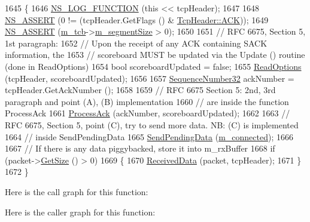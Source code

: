 \begin{DoxyCode}
1645 \{
1646   \hyperlink{log-macros-disabled_8h_a90b90d5bad1f39cb1b64923ea94c0761}{NS\_LOG\_FUNCTION} (\textcolor{keyword}{this} << tcpHeader);
1647 
1648   \hyperlink{assert_8h_a6dccdb0de9b252f60088ce281c49d052}{NS\_ASSERT} (0 != (tcpHeader.GetFlags () & \hyperlink{classns3_1_1TcpHeader_a5f3d432941327854b5ad621e467479c6a1182e63050402c9f49208c62c1ec2d5c}{TcpHeader::ACK}));
1649   \hyperlink{assert_8h_a6dccdb0de9b252f60088ce281c49d052}{NS\_ASSERT} (\hyperlink{classns3_1_1TcpSocketBase_a26bbaf59001308dc43fb630d76f2e38b}{m\_tcb}->\hyperlink{classns3_1_1TcpSocketState_a079872f7b0099ef5f3cab4ff47bd2edd}{m\_segmentSize} > 0);
1650 
1651   \textcolor{comment}{// RFC 6675, Section 5, 1st paragraph:}
1652   \textcolor{comment}{// Upon the receipt of any ACK containing SACK information, the}
1653   \textcolor{comment}{// scoreboard MUST be updated via the Update () routine (done in ReadOptions)}
1654   \textcolor{keywordtype}{bool} scoreboardUpdated = \textcolor{keyword}{false};
1655   \hyperlink{classns3_1_1TcpSocketBase_a5fc67b6d49bb81a520c67cd6018954bb}{ReadOptions} (tcpHeader, scoreboardUpdated);
1656 
1657   \hyperlink{group__network_gacb2070e4e98d2d5135c9bede58f07a03}{SequenceNumber32} ackNumber = tcpHeader.GetAckNumber ();
1658 
1659   \textcolor{comment}{// RFC 6675 Section 5: 2nd, 3rd paragraph and point (A), (B) implementation}
1660   \textcolor{comment}{// are inside the function ProcessAck}
1661   \hyperlink{classns3_1_1TcpSocketBase_a7c8a0eb71e14abececff528e8d4261b6}{ProcessAck} (ackNumber, scoreboardUpdated);
1662 
1663   \textcolor{comment}{// RFC 6675, Section 5, point (C), try to send more data. NB: (C) is implemented}
1664   \textcolor{comment}{// inside SendPendingData}
1665   \hyperlink{classns3_1_1TcpSocketBase_a129ac0ec5fc399fa7c5552c615ae6562}{SendPendingData} (\hyperlink{classns3_1_1TcpSocketBase_aa52df78102ea7c1c6b432ad9486ed0c2}{m\_connected});
1666 
1667   \textcolor{comment}{// If there is any data piggybacked, store it into m\_rxBuffer}
1668   \textcolor{keywordflow}{if} (packet->\hyperlink{classns3_1_1Packet_a462855c9929954d4301a4edfe55f4f1c}{GetSize} () > 0)
1669     \{
1670       \hyperlink{classns3_1_1TcpSocketBase_a479e1a8be1ee1b169f87e57a4dc6f73c}{ReceivedData} (packet, tcpHeader);
1671     \}
1672 \}
\end{DoxyCode}


Here is the call graph for this function\+:




Here is the caller graph for this function\+:


